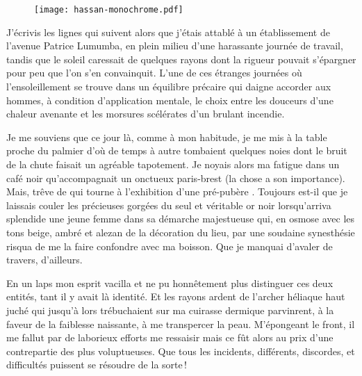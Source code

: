 \begin{figure}[h]
  \centering
  \texttt{[image: hassan-monochrome.pdf]}
  \captionsetup{labelformat=empty}
  \caption[Idéotexte de la tour  (\textarabic{حسان})]{}
\end{figure}

\begin{prose}
  J’écrivis les lignes qui suivent alors que j’étais attablé à un établissement de l’avenue Patrice Lumumba, en plein milieu d’une harassante journée de travail, tandis que le soleil caressait de quelques rayons dont la rigueur pouvait s’épargner pour peu que l’on s’en convainquit.
L’une de ces étranges journées où l’ensoleillement se trouve dans un équilibre précaire qui daigne accorder aux hommes, à condition d’application mentale, le choix entre les douceurs d’une chaleur avenante et les morsures scélérates d’un brulant incendie.

  Je me souviens que ce jour là, comme à mon habitude, je me mis à la table proche du palmier d’où de temps à autre tombaient quelques noies dont le bruit de la chute faisait un agréable tapotement. Je noyais alors ma fatigue dans un café noir qu’accompagnait un onctueux paris-brest (la chose a son importance). Mais, trêve de  qui tourne à l’exhibition d’une  pré-pubère . Toujours est-il que je laissais couler les précieuses gorgées du seul et véritable or noir lorsqu’arriva splendide une jeune femme dans sa démarche majestueuse qui, en osmose avec les tons beige, ambré et alezan de la décoration du lieu, par une soudaine synesthésie risqua de me la faire confondre avec ma boisson. Que je manquai d’avaler de travers, d’ailleurs.

  En un laps mon esprit vacilla et ne pu honnêtement plus distinguer ces deux entités, tant il y avait là identité. Et les rayons ardent de l’archer héliaque haut juché qui jusqu’à lors trébuchaient sur ma cuirasse dermique parvinrent, à la faveur de la faiblesse naissante, à me transpercer la peau. M’épongeant le front, il me fallut par de laborieux efforts me ressaisir mais ce fût alors au prix d’une contrepartie des plus voluptueuses. Que tous les incidents, différents, discordes, et difficultés puissent se résoudre de la sorte\,!


\end{prose}
